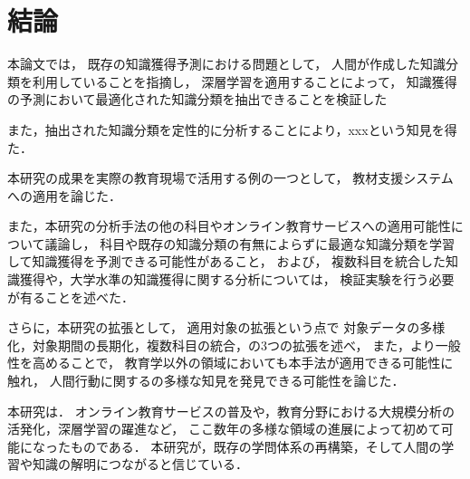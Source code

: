 \chapter{結論}
\label{chap:conlusion}
\fancyhf{}
\rhead{\thepage}
\cfoot{\thepage}


本論文では，
既存の知識獲得予測における問題として，
人間が作成した知識分類を利用していることを指摘し，
深層学習を適用することによって，
知識獲得の予測において最適化された知識分類を抽出できることを検証した

また，抽出された知識分類を定性的に分析することにより，xxxという知見を得た．
\vvspace

本研究の成果を実際の教育現場で活用する例の一つとして，
教材支援システムへの適用を論じた．

また，本研究の分析手法の他の科目やオンライン教育サービスへの適用可能性について議論し，
科目や既存の知識分類の有無によらずに最適な知識分類を学習して知識獲得を予測できる可能性があること，
および，
複数科目を統合した知識獲得や，大学水準の知識獲得に関する分析については，
検証実験を行う必要が有ることを述べた．
\vvspace


さらに，本研究の拡張として，
適用対象の拡張という点で
対象データの多様化，対象期間の長期化，複数科目の統合，の3つの拡張を述べ，
また，より一般性を高めることで，
教育学以外の領域においても本手法が適用できる可能性に触れ，
人間行動に関するの多様な知見を発見できる可能性を論じた．
\vvspace

本研究は．
オンライン教育サービスの普及や，教育分野における大規模分析の活発化，深層学習の躍進など，
ここ数年の多様な領域の進展によって初めて可能になったものである．
本研究が，既存の学問体系の再構築，そして人間の学習や知識の解明につながると信じている．

